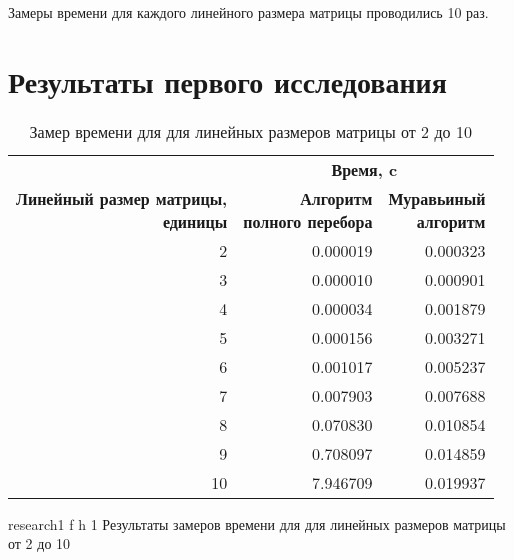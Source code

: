 Замеры времени для каждого линейного размера матрицы проводились 10 раз. 

\section*{Результаты первого исследования}

\begin{table}[ht]
	\small
	\begin{center}
		\begin{threeparttable}
			\caption{Замер времени для  для линейных размеров матрицы от 2 до 10}
			\label{tbl:time}
			\begin{tabular}{|r|r|r|}
				\hline
				& \multicolumn{2}{c|}{\bfseries Время, c} \\ \cline{2-3}
				\bfseries \makecell{Линейный размер матрицы, \\ единицы} & \bfseries \makecell{Алгоритм \\ полного перебора} & \bfseries \makecell{Муравьиный \\ алгоритм} \\ \cline{2-3}
				\hline
		         2 &   0.000019 &   0.000323 \\ \hline
		         3 &   0.000010 &   0.000901 \\ \hline
		         4 &   0.000034 &   0.001879 \\ \hline
		         5 &   0.000156 &   0.003271 \\ \hline
		         6 &   0.001017 &   0.005237 \\ \hline
		         7 &   0.007903 &   0.007688 \\ \hline
		         8 &   0.070830 &   0.010854 \\ \hline
		         9 &   0.708097 &   0.014859 \\ \hline
		        10 &   7.946709 &   0.019937 \\ \hline
			\end{tabular}	
		\end{threeparttable}
	\end{center}
\end{table}

\clearpage

{research1} %
{f} %
{h} %
{1\textwidth} %
{Результаты замеров времени для для линейных размеров матрицы от 2 до 10} %

